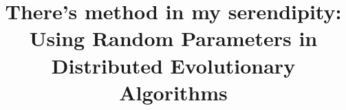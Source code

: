 \documentclass{llncs}
\begin{document}
\title{There's method in my serendipity:  Using Random Parameters in
  Distributed Evolutionary Algorithms}


\maketitle              %






\end{document}
